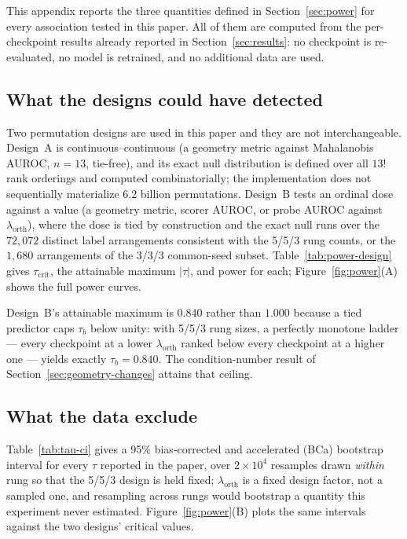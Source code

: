 This appendix reports the three quantities defined in Section~\ref{sec:power}
for every association tested in this paper. All of them are computed from the
per-checkpoint results already reported in Section~\ref{sec:results}: no
checkpoint is re-evaluated, no model is retrained, and no additional data are
used.

\subsection{What the designs could have detected}
\label{app:power-design}

Two permutation designs are used in this paper and they are not
interchangeable. Design~A is continuous--continuous (a geometry metric against
Mahalanobis AUROC, $n = 13$, tie-free), and its exact null distribution is
defined over all $13!$ rank orderings and computed combinatorially; the
implementation does not sequentially materialize 6.2 billion permutations.
Design~B tests an ordinal dose against a value (a geometry metric,
scorer AUROC, or probe AUROC against $\lambda_{\mathrm{orth}}$), where the dose
is tied by construction and the exact null runs over the $72{,}072$ distinct
label arrangements consistent with the 5/5/3 rung counts, or the $1{,}680$
arrangements of the 3/3/3 common-seed subset. Table~\ref{tab:power-design}
gives $\tau_{\mathrm{crit}}$, the attainable maximum $|\tau|$, and power for
each; Figure~\ref{fig:power}(A) shows the full power curves.

Design~B's attainable maximum is $0.840$ rather than $1.000$ because a tied
predictor caps $\tau_b$ below unity: with 5/5/3 rung sizes, a perfectly
monotone ladder --- every checkpoint at a lower $\lambda_{\mathrm{orth}}$
ranked below every checkpoint at a higher one --- yields exactly $\tau_b =
0.840$. The condition-number result of Section~\ref{sec:geometry-changes}
attains that ceiling.



\subsection{What the data exclude}
\label{app:power-ci}

Table~\ref{tab:tau-ci} gives a 95\% bias-corrected and accelerated (BCa)
bootstrap interval \citep{efron1987better} for every $\tau$ reported in the
paper, over $2\times10^{4}$ resamples drawn \emph{within} rung so that the
5/5/3 design is held fixed; $\lambda_{\mathrm{orth}}$ is a fixed design factor,
not a sampled one, and resampling across rungs would bootstrap a quantity this
experiment never estimated. Figure~\ref{fig:power}(B) plots the same intervals
against the two designs' critical values.

